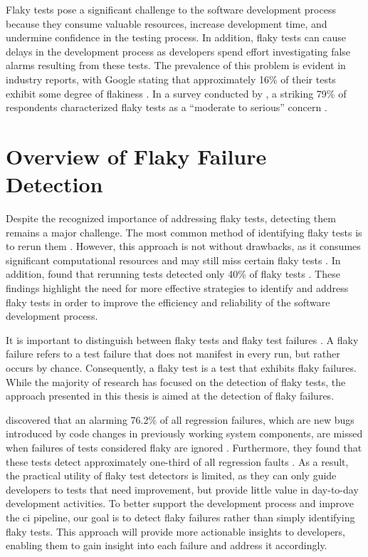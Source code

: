 Flaky tests pose a significant challenge to the software development process because they consume valuable resources, increase development time, and undermine confidence in the testing process.
In addition, flaky tests can cause delays in the development process as developers spend effort investigating false alarms resulting from these tests.
The prevalence of this problem is evident in industry reports, with Google stating that approximately 16\% of their tests exhibit some degree of flakiness \autocite{micco_state_2017}.
In a survey conducted by \citeauthor*{eck_understanding_2019}, a striking 79\% of respondents characterized flaky tests as a \enquote{moderate to serious} concern \autocite{eck_understanding_2019}.

\section{Overview of Flaky Failure Detection}
Despite the recognized importance of addressing flaky tests, detecting them remains a major challenge.
The most common method of identifying flaky tests is to rerun them \autocite{lam_idflakies_2019, lam_understanding_2020}.
However, this approach is not without drawbacks, as it consumes significant computational resources and may still miss certain flaky tests \autocite{bell_deflaker_2018, luo_empirical_2014}.
In addition, \citeauthor*{parry_what_2022} found that rerunning tests detected only 40\% of flaky tests \autocite{parry_what_2022}.
These findings highlight the need for more effective strategies to identify and address flaky tests in order to improve the efficiency and reliability of the software development process.

It is important to distinguish between flaky tests and flaky test failures \autocite{haben_importance_2023}.
A flaky failure refers to a test failure that does not manifest in every run, but rather occurs by chance.
Consequently, a flaky test is a test that exhibits flaky failures.
While the majority of research has focused on the detection of flaky tests, the approach presented in this thesis is aimed at the detection of flaky failures.

 discovered that an alarming 76.2\% of all regression failures, which are new bugs introduced by code changes in previously working system components, are missed when failures of tests considered flaky are ignored \autocite{haben_importance_2023}.
Furthermore, they found that these tests detect approximately one-third of all regression faults \autocite{haben_importance_2023}.
As a result, the practical utility of flaky test detectors is limited, as they can only guide developers to tests that need improvement, but provide little value in day-to-day development activities.
To better support the development process and improve the \ac{ci} pipeline, our goal is to detect flaky failures rather than simply identifying flaky tests.
This approach will provide more actionable insights to developers, enabling them to gain insight into each failure and address it accordingly.

